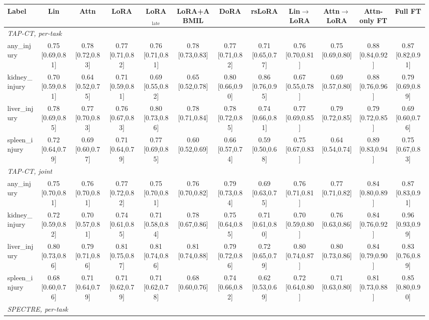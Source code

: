 \begin{tabular}{lccccccccccc}
\toprule
Label & Lin & Attn & LoRA & LoRA$_{\text{late}}$ & LoRA+ABMIL & DoRA & rsLoRA & Lin$\to$LoRA & Attn$\to$LoRA & Attn-only FT & Full FT \\
\midrule
\multicolumn{12}{l}{\textit{TAP-CT, per-task}} \\
any\_injury & 0.75 [0.69,0.81] & 0.78 [0.72,0.83] & 0.77 [0.71,0.82] & 0.76 [0.71,0.81] & 0.78 [0.73,0.83] & 0.77 [0.71,0.82] & 0.71 [0.65,0.77] & 0.76 [0.70,0.81] & 0.75 [0.69,0.80] & 0.88 [0.84,0.92] & 0.87 [0.82,0.91] \\
kidney\_injury & 0.70 [0.59,0.81] & 0.64 [0.52,0.75] & 0.71 [0.59,0.81] & 0.69 [0.55,0.82] & 0.65 [0.52,0.78] & 0.80 [0.66,0.90] & 0.86 [0.76,0.95] & 0.67 [0.55,0.78] & 0.69 [0.57,0.80] & 0.88 [0.76,0.96] & 0.79 [0.69,0.89] \\
liver\_injury & 0.78 [0.69,0.85] & 0.77 [0.70,0.83] & 0.76 [0.67,0.83] & 0.80 [0.73,0.86] & 0.78 [0.71,0.84] & 0.78 [0.72,0.85] & 0.74 [0.66,0.81] & 0.77 [0.69,0.85] & 0.79 [0.72,0.85] & 0.79 [0.72,0.85] & 0.69 [0.60,0.76] \\
spleen\_injury & 0.72 [0.64,0.79] & 0.69 [0.60,0.77] & 0.71 [0.64,0.79] & 0.77 [0.69,0.85] & 0.60 [0.52,0.69] & 0.66 [0.57,0.74] & 0.59 [0.50,0.68] & 0.75 [0.67,0.83] & 0.64 [0.54,0.74] & 0.89 [0.83,0.94] & 0.75 [0.67,0.83] \\
\multicolumn{12}{l}{\textit{TAP-CT, joint}} \\
any\_injury & 0.75 [0.70,0.81] & 0.76 [0.70,0.81] & 0.77 [0.72,0.82] & 0.75 [0.70,0.81] & 0.76 [0.70,0.82] & 0.79 [0.73,0.84] & 0.69 [0.63,0.75] & 0.76 [0.71,0.81] & 0.77 [0.71,0.82] & 0.84 [0.80,0.89] & 0.87 [0.83,0.91] \\
kidney\_injury & 0.72 [0.59,0.82] & 0.70 [0.57,0.81] & 0.74 [0.61,0.85] & 0.71 [0.58,0.84] & 0.78 [0.67,0.86] & 0.75 [0.64,0.85] & 0.71 [0.61,0.80] & 0.70 [0.59,0.80] & 0.76 [0.63,0.86] & 0.84 [0.76,0.92] & 0.96 [0.93,0.99] \\
liver\_injury & 0.80 [0.73,0.86] & 0.79 [0.71,0.86] & 0.81 [0.75,0.87] & 0.81 [0.74,0.86] & 0.81 [0.74,0.88] & 0.79 [0.72,0.86] & 0.72 [0.65,0.79] & 0.80 [0.74,0.87] & 0.80 [0.73,0.86] & 0.84 [0.79,0.90] & 0.83 [0.76,0.89] \\
spleen\_injury & 0.68 [0.60,0.76] & 0.71 [0.64,0.79] & 0.71 [0.62,0.79] & 0.71 [0.62,0.78] & 0.68 [0.60,0.76] & 0.74 [0.66,0.82] & 0.62 [0.53,0.69] & 0.72 [0.64,0.80] & 0.71 [0.63,0.80] & 0.81 [0.73,0.88] & 0.85 [0.80,0.90] \\
\multicolumn{12}{l}{\textit{SPECTRE, per-task}} \\

\end{tabular}
